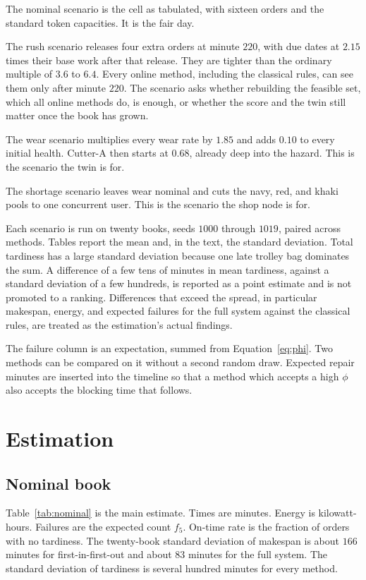 The nominal scenario is the cell as tabulated, with sixteen orders and the standard token capacities. It is the fair day.

The rush scenario releases four extra orders at minute \(220\), with due dates at \(2.15\) times their base work after that release. They are tighter than the ordinary multiple of \(3.6\) to \(6.4\). Every online method, including the classical rules, can see them only after minute \(220\). The scenario asks whether rebuilding the feasible set, which all online methods do, is enough, or whether the score and the twin still matter once the book has grown.

The wear scenario multiplies every wear rate by \(1.85\) and adds \(0.10\) to every initial health. Cutter-A then starts at \(0.68\), already deep into the hazard. This is the scenario the twin is for.

The shortage scenario leaves wear nominal and cuts the navy, red, and khaki pools to one concurrent user. This is the scenario the shop node is for.

Each scenario is run on twenty books, seeds \(1000\) through \(1019\), paired across methods. Tables report the mean and, in the text, the standard deviation. Total tardiness has a large standard deviation because one late trolley bag dominates the sum. A difference of a few tens of minutes in mean tardiness, against a standard deviation of a few hundreds, is reported as a point estimate and is not promoted to a ranking. Differences that exceed the spread, in particular makespan, energy, and expected failures for the full system against the classical rules, are treated as the estimation's actual findings.

The failure column is an expectation, summed from Equation~\eqref{eq:phi}. Two methods can be compared on it without a second random draw. Expected repair minutes are inserted into the timeline so that a method which accepts a high \(\phi\) also accepts the blocking time that follows.

\section{Estimation}
\label{sec:estimate}

\subsection{Nominal book}

Table~\ref{tab:nominal} is the main estimate. Times are minutes. Energy is kilowatt-hours. Failures are the expected count \(f_5\). On-time rate is the fraction of orders with no tardiness. The twenty-book standard deviation of makespan is about \(166\) minutes for first-in-first-out and about \(83\) minutes for the full system. The standard deviation of tardiness is several hundred minutes for every method.

